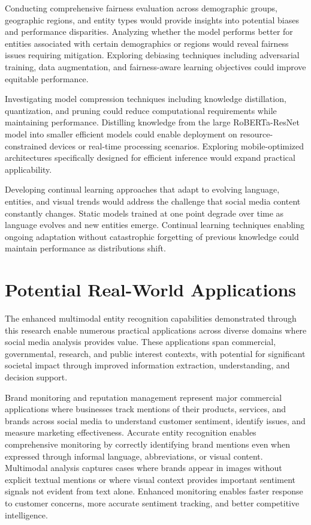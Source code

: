 \documentclass[12pt,a4paper]{report}
\begin{document}
Conducting comprehensive fairness evaluation across demographic groups, geographic regions, and entity types would provide insights into potential biases and performance disparities. Analyzing whether the model performs better for entities associated with certain demographics or regions would reveal fairness issues requiring mitigation. Exploring debiasing techniques including adversarial training, data augmentation, and fairness-aware learning objectives could improve equitable performance.

Investigating model compression techniques including knowledge distillation, quantization, and pruning could reduce computational requirements while maintaining performance. Distilling knowledge from the large RoBERTa-ResNet model into smaller efficient models could enable deployment on resource-constrained devices or real-time processing scenarios. Exploring mobile-optimized architectures specifically designed for efficient inference would expand practical applicability.

Developing continual learning approaches that adapt to evolving language, entities, and visual trends would address the challenge that social media content constantly changes. Static models trained at one point degrade over time as language evolves and new entities emerge. Continual learning techniques enabling ongoing adaptation without catastrophic forgetting of previous knowledge could maintain performance as distributions shift.

\section{Potential Real-World Applications}

The enhanced multimodal entity recognition capabilities demonstrated through this research enable numerous practical applications across diverse domains where social media analysis provides value. These applications span commercial, governmental, research, and public interest contexts, with potential for significant societal impact through improved information extraction, understanding, and decision support.

Brand monitoring and reputation management represent major commercial applications where businesses track mentions of their products, services, and brands across social media to understand customer sentiment, identify issues, and measure marketing effectiveness. Accurate entity recognition enables comprehensive monitoring by correctly identifying brand mentions even when expressed through informal language, abbreviations, or visual content. Multimodal analysis captures cases where brands appear in images without explicit textual mentions or where visual context provides important sentiment signals not evident from text alone. Enhanced monitoring enables faster response to customer concerns, more accurate sentiment tracking, and better competitive intelligence.
\end{document}
